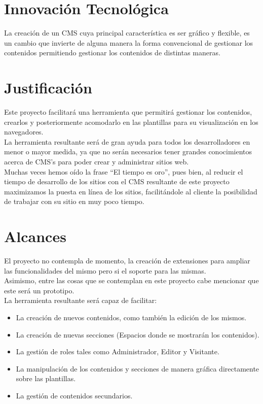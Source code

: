 \section{Innovaci\'on Tecnol\'ogica}
La creaci\'on de un CMS cuya principal caracter\'istica es ser gr\'afico y flexible, es un cambio que invierte de alguna manera la forma convencional de gestionar los contenidos permitiendo gestionar los contenidos de distintas maneras.

\section{Justificaci\'on}
Este proyecto facilitar\'a una herramienta que permitir\'a gestionar los contenidos, crearlos y posteriormente acomodarlo en las plantillas para su visualizaci\'on en los navegadores.\\

La herramienta resultante ser\'a de gran ayuda para todos los desarrolladores en menor o mayor medida, ya que no ser\'an necesarios tener grandes conocimientos acerca de CMS's para poder crear y administrar sitios web.\\

Muchas veces hemos o\'ido la frase ``El tiempo es oro'', pues bien, al reducir el tiempo de desarrollo de los sitios con el CMS resultante de este proyecto maximizamos la puesta en l\'inea de los sitios, facilit\'andole al cliente la posibilidad de trabajar con su sitio en muy poco tiempo.

\section{Alcances}
El proyecto no contempla de momento, la creaci\'on de extensiones para ampliar las funcionalidades del mismo pero si el soporte para las mismas.\\

Asimismo, entre las cosas que se contemplan en este proyecto cabe mencionar que este ser\'a un prototipo.\\

La herramienta resultante ser\'a capaz de facilitar:
\begin{itemize}
\item La creaci\'on de nuevos contenidos, como tambi\'en la edici\'on de los mismos.
\item La creaci\'on de nuevas secciones (Espacios donde se mostrar\'an los contenidos).
\item La gesti\'on de roles tales como Administrador, Editor y Visitante.
\item La manipulaci\'on de los contenidos y secciones de manera gr\'afica directamente sobre las plantillas.
\item La gesti\'on de contenidos secundarios.
\end{itemize}

\clearpage
